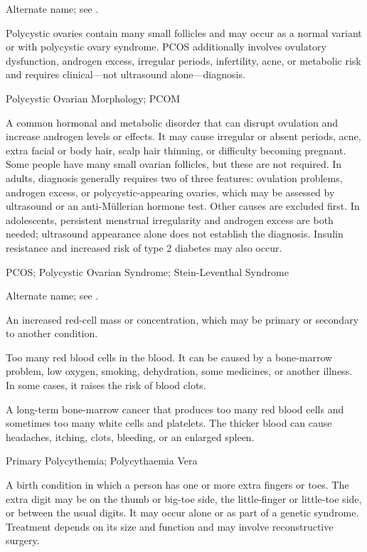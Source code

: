  Alternate name; see .

 Polycystic ovaries contain many small follicles and may occur as a normal variant or with polycystic ovary syndrome. PCOS additionally involves ovulatory dysfunction, androgen excess, irregular periods, infertility, acne, or metabolic risk and requires clinical—not ultrasound alone—diagnosis.

\synonyms
Polycystic Ovarian Morphology; PCOM

 A common hormonal and metabolic disorder that can disrupt ovulation and increase androgen levels or effects. It may cause irregular or absent periods, acne, extra facial or body hair, scalp hair thinning, or difficulty becoming pregnant. Some people have many small ovarian follicles, but these are not required.
In adults, diagnosis generally requires two of three features: ovulation problems, androgen excess, or polycystic-appearing ovaries, which may be assessed by ultrasound or an anti-Müllerian hormone test. Other causes are excluded first.
In adolescents, persistent menstrual irregularity and androgen excess are both needed; ultrasound appearance alone does not establish the diagnosis. Insulin resistance and increased risk of type 2 diabetes may also occur.

\synonyms
PCOS; Polycystic Ovarian Syndrome; Stein-Leventhal Syndrome

 Alternate name; see .

 An increased red-cell mass or concentration, which may be primary or secondary to another condition.

 Too many red blood cells in the blood. It can be caused by a bone-marrow problem, low oxygen, smoking, dehydration, some medicines, or another illness. In some cases, it raises the risk of blood clots.

 A long-term bone-marrow cancer that produces too many red blood cells and sometimes too many white cells and platelets. The thicker blood can cause headaches, itching, clots, bleeding, or an enlarged spleen.

\synonyms
Primary Polycythemia; Polycythaemia Vera

 A birth condition in which a person has one or more extra fingers or toes. The extra digit may be on the thumb or big-toe side, the little-finger or little-toe side, or between the usual digits. It may occur alone or as part of a genetic syndrome. Treatment depends on its size and function and may involve reconstructive surgery.

